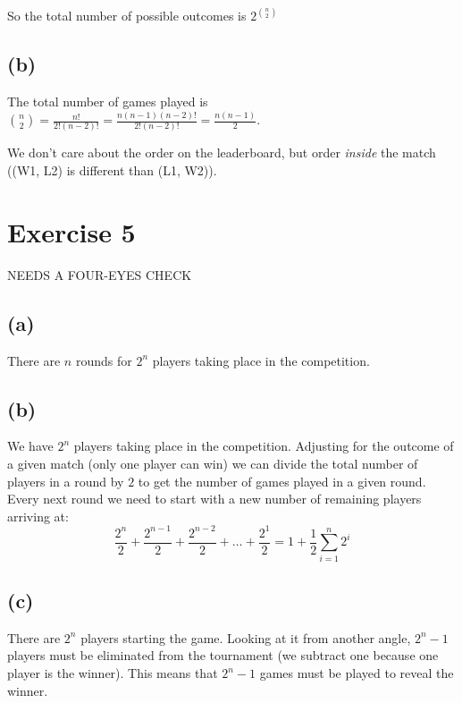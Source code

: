 \documentclass{article}
\begin{document}
So the total number of possible outcomes is \(2^{\binom{n}{2}}\)
\subsection*{(b)}
The total number of games played is \(\binom{n}{2} = \frac{n!}{2!(n - 2)!} = \frac{n(n-1)(n-2)!}{2!(n-2)!} = \frac{n(n-1)}{2}\).

We don't care about the order on the leaderboard, but order \emph{inside} the match
((W1, L2) is different than (L1, W2)).

\section*{Exercise 5}
\begin{center}
    NEEDS A FOUR-EYES CHECK
\end{center}
\subsection*{(a)}
There are \(n\) rounds for \(2^n\) players taking place in the competition.

\subsection*{(b)}
We have \(2^n\) players taking place in the competition. Adjusting for the outcome of a given match (only one player can win)
we can divide the total number of players in a round by \(2\) to get the number of games played in a given round. Every next
round we need to start with a new number of remaining players arriving at:
\begin{equation*}
    \frac{2^n}{2} + \frac{2^{n-1}}{2} + \frac{2^{n-2}}{2} + \dots + \frac{2^1}{2} = 1 + \frac{1}{2} \sum_{i=1}^{n} 2^i
\end{equation*}

\subsection*{(c)}
There are \(2^n\) players starting the game. Looking at it from another angle, \(2^{n} - 1\) players must be eliminated
from the tournament (we subtract one because one player is the winner). This means that \(2^{n} - 1\) games
must be played to reveal the winner.
\end{document}

